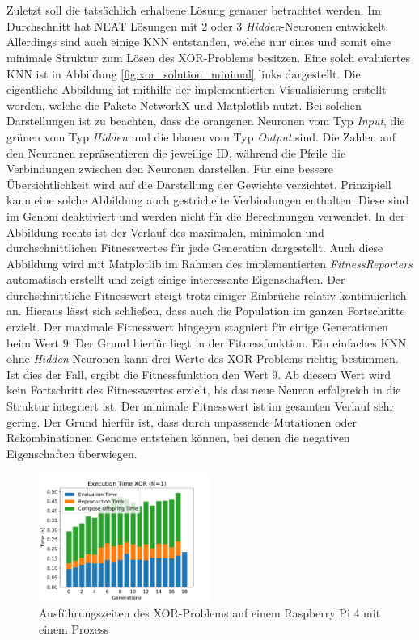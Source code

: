 \\\\
Zuletzt soll die tatsächlich erhaltene Lösung genauer betrachtet werden. Im Durchschnitt hat \ac{NEAT} Lösungen mit 2 oder 3 \emph{Hidden}-Neuronen entwickelt. Allerdings sind auch einige \ac{KNN} entstanden, welche nur eines und somit eine minimale Struktur zum Lösen des XOR-Problems besitzen. Eine solch evaluiertes \ac{KNN} ist in Abbildung \ref{fig:xor_solution_minimal} links dargestellt. Die eigentliche Abbildung ist mithilfe der implementierten Visualisierung erstellt worden, welche die Pakete NetworkX und Matplotlib nutzt. Bei solchen Darstellungen ist zu beachten, dass die orangenen Neuronen vom Typ \emph{Input}, die grünen vom Typ \emph{Hidden} und die blauen vom Typ \emph{Output} sind. Die Zahlen auf den Neuronen repräsentieren die jeweilige ID, während die Pfeile die Verbindungen zwischen den Neuronen darstellen. Für eine bessere Übersichtlichkeit wird auf die Darstellung der Gewichte verzichtet. Prinzipiell kann eine solche Abbildung auch gestrichelte Verbindungen enthalten. Diese sind im Genom deaktiviert und werden nicht für die Berechnungen verwendet. In der Abbildung rechts ist der Verlauf des maximalen, minimalen und durchschnittlichen Fitnesswertes für jede Generation dargestellt. Auch diese Abbildung wird mit Matplotlib im Rahmen des implementierten \emph{FitnessReporters} automatisch erstellt und zeigt einige interessante Eigenschaften. Der durchschnittliche Fitnesswert steigt trotz einiger Einbrüche relativ kontinuierlich an. Hieraus lässt sich schließen, dass auch die Population im ganzen Fortschritte erzielt. Der maximale Fitnesswert hingegen stagniert für einige Generationen beim Wert $9$. Der Grund hierfür liegt in der Fitnessfunktion. Ein einfaches \ac{KNN} ohne \emph{Hidden}-Neuronen kann drei Werte des XOR-Problems richtig bestimmen. Ist dies der Fall, ergibt die Fitnessfunktion den Wert $9$. Ab diesem Wert wird kein Fortschritt des Fitnesswertes erzielt, bis das neue Neuron erfolgreich in die Struktur integriert ist. Der minimale Fitnesswert ist im gesamten Verlauf sehr gering. Der Grund hierfür ist, dass durch unpassende Mutationen oder Rekombinationen Genome entstehen können, bei denen die negativen Eigenschaften überwiegen. 
\begin{figure}[!h]
	\centering
	\includegraphics[width=0.5\textwidth]{./img/xor_single_core/xor_execution_time_1.pdf} 
	\caption{Ausführungszeiten des XOR-Problems auf einem Raspberry Pi 4 mit einem Prozess}
	\label{fig:xor_single_core_performance}
\end{figure}
